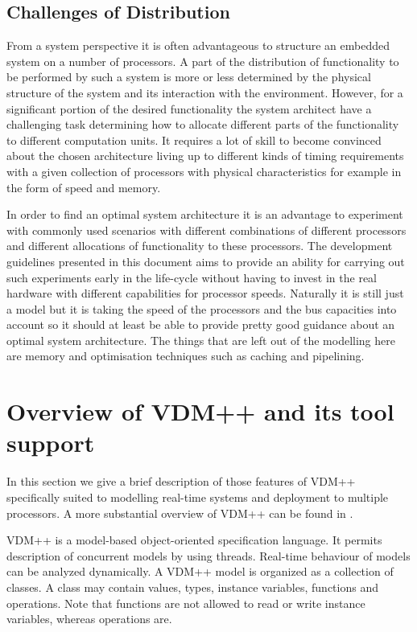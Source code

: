 \documentclass{overturerepchap}
\begin{document}
\subsection{Challenges of Distribution}

From a system perspective it is often advantageous to structure an 
embedded system on a number of processors. A part of the distribution
of functionality to be performed by such a system is more or less
determined by the physical structure of the system and its interaction
with the environment. However, for a significant portion of the desired 
functionality the system architect have a challenging task determining 
how to allocate different parts of the functionality to different 
computation units. It requires a lot of skill to become convinced
about the chosen architecture living up to different kinds of timing 
requirements with a given collection of processors with physical 
characteristics for example in the form of speed and memory. 

In order to find an optimal system architecture it is an advantage
to experiment with commonly used scenarios with different combinations of 
different processors and different allocations of functionality to 
these processors. The development guidelines presented in this document
aims to provide an ability for carrying out such experiments early in
the life-cycle without having to invest in the real hardware with 
different capabilities for processor speeds. Naturally it is still just a
model but it is taking the speed of the processors and the bus capacities 
into account so it should at least be able to provide pretty good guidance
about an optimal system architecture. The things that are left out of
the modelling here are memory and optimisation techniques such as caching
and pipelining.

\section{Overview of VDM++ and its tool support}

In this section we give a brief description of those features of VDM++
specifically suited to modelling real-time systems and deployment to
multiple processors. A more substantial overview of VDM++ can be found
in \cite{LangManPP}.

VDM++ is a model-based object-oriented specification language. It
permits description of concurrent models by using threads. Real-time
behaviour of models can be analyzed dynamically. A VDM++ model is
organized as a collection of classes. A class may contain values,
types, instance variables, functions and operations. Note that
functions are not allowed to read or write instance variables, whereas
operations are.
\end{document}
